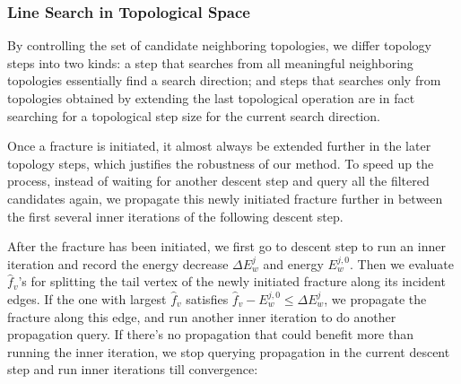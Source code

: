 

\subsubsection{Line Search in Topological Space}
\label{sec:topo_lineSearch}

By controlling the set of candidate neighboring topologies, we differ topology steps into two kinds: a step that searches from all meaningful neighboring topologies essentially find a search direction; and steps that searches only from topologies obtained by extending the last topological operation are in fact searching for a topological step size for the current search direction.

Once a fracture is initiated, it almost always be extended further in the later topology steps, which justifies the robustness of our method. To speed up the process, instead of waiting for another descent step and query all the filtered candidates again, we propagate this newly initiated fracture further in between the first several inner iterations of the following descent step.

After the fracture has been initiated, we first go to descent step to run an inner iteration and record the energy decrease $\Delta E_w^j$ and energy $E_w^{j,0}$. Then we evaluate $\hat{f}_v$'s for splitting the tail vertex of the newly initiated fracture along its incident edges. If the one with largest $\hat{f}_v$ satisfies $\hat{f}_v - E_w^{j,0} \leq \Delta E_w^j$, we propagate the fracture along this edge, and run another inner iteration to do another propagation query. If there's no propagation that could benefit more than running the inner iteration, we stop querying propagation in the current descent step and run inner iterations till convergence:

